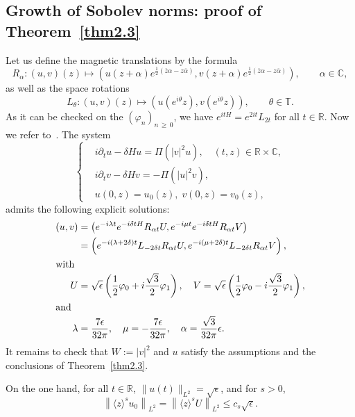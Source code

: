 \documentclass[AHL,Unicode,published]{cedram}
\newcommand{\C}{\mathbb{C}}
\newcommand{\R}{\mathbb{R}}
\newcommand{\T}{\mathbb{T}}
\newcommand*\eps{\epsilon}
\newcommand*\dis{\displaystyle}
\newcommand{\<}{\langle}
\renewcommand{\>}{\rangle}
\renewcommand{\phi}{\varphi}
\newcommand{\R}{\mathbb{R}}
\begin{document}
\subsection{Growth of Sobolev norms: proof of Theorem~\ref{thm2.3}}\label{para3.3}
Let us define the magnetic translations by the formula
\[
R_{\alpha} :(u,v)(z) \mapsto \left(u(z+\alpha) e^{\frac{1}{2}(\overline z
\alpha - z \overline{\alpha})}, v(z+\alpha) e^{\frac{1}{2}(\overline z \alpha - z \overline{\alpha})} \right), \qquad \alpha \in \C,
\]
as well as the space rotations
\[
L_{\theta} :(u,v)(z) \mapsto \left(u\left(e^{i\theta}z\right), v\left(e^{i\theta}z\right) \right), \qquad \theta \in \T.
\]
As it can be checked on the $(\phi_n)_{n\,\geq\,0}$, we have $e^{itH}= e^{2it}L_{2t}$ for all $t\in \R$. Now we refer to~\cite[Section~1.7.2]{Schw-Tho}. The system
\[
\left\{
\begin{aligned}
&i\partial_{t}{u}-\delta H{u} = \Pi \left(|{v}|^2 {u}\right), \quad (t,z)\in \R\times \C,\\
&i\partial_{t}{v}-\delta H{v}= - \Pi\left(|{u}|^2 {v}\right),\\
&{u}(0,z)= u_0(z),\; {v}(0,z)= v_0(z),
\end{aligned}
\right.
\]
admits the following explicit solutions:
\begin{align*}
(u,v)&=\left(e^{-i\lambda t} e^{-i \delta t H} R_{\alpha t} U, e^{-i\mu t} e^{-i\delta t H} R_{\alpha t} V \right)\\
&=\left(e^{-i(\lambda +2\delta)t} L_{-2\delta t}R_{\alpha t} U, e^{-i(\mu +2\delta)t} L_{-2\delta t} R_{\alpha t} V \right),\\
\intertext{with}
\dis U &=\sqrt{\eps}\left(\frac12\phi_0+i\frac{\sqrt{3}}2\phi_1\right), \quad V=\sqrt{\eps}\left(\frac12\phi_0-i\frac{\sqrt{3}}2\phi_1\right),
\\
\intertext{and}
\lambda &= \frac{7\eps}{32\pi}, \quad \mu = -\frac{7\eps}{32\pi}, \quad \alpha=\frac{\sqrt{3}}{32 \pi}\eps.
\end{align*}
It remains to check that $W:=|v|^2$ and $u$ satisfy the assumptions and the conclusions of Theorem~\ref{thm2.3}.

On the one hand, for all $t\in \R$, $\|u(t)\|_{L^2}=\sqrt{\eps}$, and for $s>0$,
\begin{equation}\label{nor-0}
\left\|\<z\>^s u_0\right\|_{L^2}= \left\|\<z\>^s U\right\|_{L^2} \leq c_s \sqrt{\eps}.
\end{equation}
\end{document}
